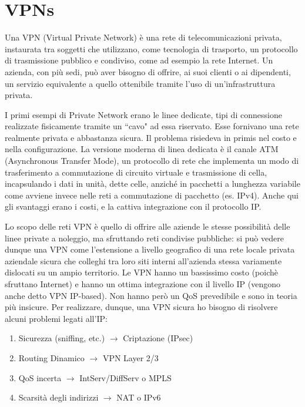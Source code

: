 \chapter{VPNs}
Una VPN (Virtual Private Network) è una rete di telecomunicazioni privata, instaurata tra soggetti che utilizzano, come tecnologia di trasporto, un protocollo di trasmissione pubblico e condiviso, come ad esempio la rete Internet. Un azienda, con più sedi, può aver bisogno di offrire, ai suoi clienti o ai dipendenti, un servizio equivalente a quello ottenibile tramite l'uso di un'infrastruttura privata. 

I primi esempi di Private Network erano le linee dedicate, tipi di connessione realizzate fisicamente tramite un \textquotedblleft cavo" ad essa riservato. Esse fornivano una rete realmente privata e abbastanza sicura. Il problema risiedeva in primis nel costo e nella configurazione. La versione moderna di linea dedicata è il canale ATM (Asynchronous Transfer Mode), un protocollo di rete che implementa un modo di trasferimento a commutazione di circuito virtuale e trasmissione di cella, incapsulando i dati in unità, dette celle, anziché in pacchetti a lunghezza variabile come avviene invece nelle reti a commutazione di pacchetto (es. IPv4). Anche qui gli svantaggi erano i costi, e la cattiva integrazione con il protocollo IP.

Lo scopo delle reti VPN è quello di offrire alle aziende le stesse possibilità delle linee private a noleggio, ma sfruttando reti condivise pubbliche: si può vedere dunque una VPN come l'estensione a livello geografico di una rete locale privata aziendale sicura che colleghi tra loro siti interni all'azienda stessa variamente dislocati su un ampio territorio. Le VPN hanno un bassissimo costo (poichè sfruttano Internet) e hanno un ottima integrazione con il livello IP (vengono anche detto VPN IP-based). Non hanno però un QoS prevedibile e sono in teoria più insicure. Per realizzare, dunque, una VPN sicura ho bisogno di risolvere alcuni problemi legati all'IP:
\begin{enumerate}
\item Sicurezza (sniffing, etc.) $\rightarrow$ Criptazione (IPsec)
\item Routing Dinamico $\rightarrow$ VPN Layer 2/3
\item QoS incerta $\rightarrow$ IntServ/DiffServ o MPLS
\item Scarsità degli indirizzi $\rightarrow$ NAT o IPv6
\end{enumerate}

